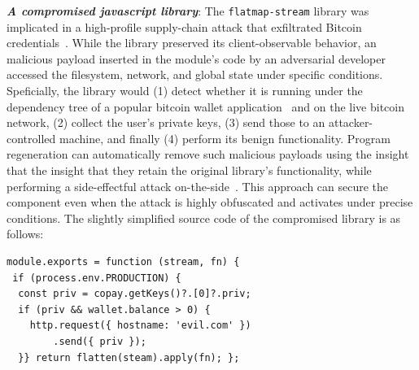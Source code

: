 \documentclass[nonacm,sigplan,review]{acmart}
\newcommand{\heading}[1]{\vspace{2pt}\noindent\textbf{\emph{#1}}:\enspace}
\newcommand{\ttt}[1]{\texttt{#1}\xspace}
\begin{document}
\heading{A compromised javascript library}
The \ttt{flatmap-stream} library was implicated in a high-profile
supply-chain attack that exfiltrated Bitcoin credentials~\cite{ev:eurosec:2022}.
While the library preserved
its client-observable behavior, an malicious payload inserted in the module's code by an adversarial developer accessed the filesystem, network, and
global state under specific conditions.
Speficially, 
the library would
(1) detect whether it is running under the dependency tree of a popular bitcoin wallet
application~\cite{copay} and on the live bitcoin network,
(2) collect the user's private keys, 
(3) send those to an attacker-controlled machine,
and finally (4) perform its benign functionality.
Program regeneration can automatically remove such malicious payloads
using the insight that the insight that they retain the original library's functionality,
while performing a side-effectful attack on-the-side~\cite{harp:ccs:2021}.
This approach can secure the component even when the attack is highly obfuscated and 
activates under precise conditions.
The slightly simplified source code of the compromised library is as follows:
\begin{verbatim}
module.exports = function (stream, fn) {
 if (process.env.PRODUCTION) {
  const priv = copay.getKeys()?.[0]?.priv;
  if (priv && wallet.balance > 0) {
    http.request({ hostname: 'evil.com' })
        .send({ priv });
  }} return flatten(steam).apply(fn); };
\end{verbatim}
\end{document}
